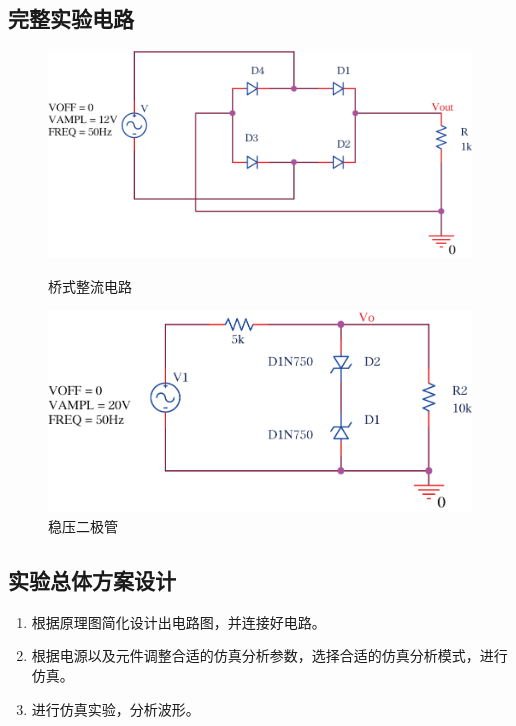 \documentclass{../source/Experiment}
\begin{document}
            \subsection{完整实验电路}
            \newpage
            \begin{figure}[h]          
                \begin{minipage}[t]{0.5\textwidth}
                    \centering
                    \includegraphics[scale=0.8]{pic/桥式与稳压二极管/brg1.png}
                    \caption{桥式整流电路\label{fig:1}}
                \end{minipage}
                \qquad
                \begin{minipage}[t]{0.5\textwidth}
                    \centering
                    \includegraphics[scale=0.8]{pic/桥式与稳压二极管/d1.png}
                    \caption{稳压二极管\label{fig:2}}
                \end{minipage}
            \end{figure}
            \subsection{实验总体方案设计}
            \begin{enumerate}
                \item 根据原理图简化设计出电路图，并连接好电路。
                \item 根据电源以及元件调整合适的仿真分析参数，选择合适的仿真分析模式，进行仿真。
                \item 进行仿真实验，分析波形。
            \end{enumerate}
\end{document}
